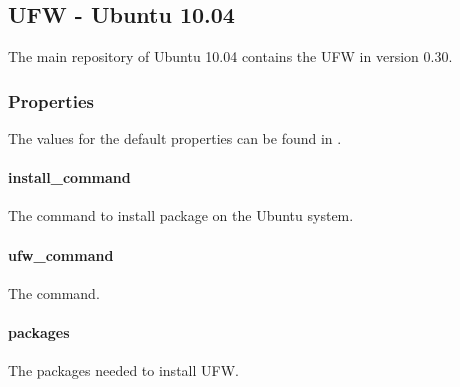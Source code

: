 \subsection{UFW - Ubuntu 10.04}

The main repository of Ubuntu 10.04 contains the UFW in version 0.30.

\subsubsection{Properties}

The values for the default properties can be found
in .

\paragraph{install\_command}


The command to install package on the Ubuntu system.

\paragraph{ufw\_command}


The  command.

\paragraph{packages}


The packages needed to install UFW.

